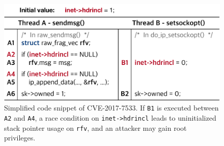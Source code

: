\begin{figure}[t]
  \centering
  \includegraphics[width=0.95\linewidth]{fig/cve-2017-10661.pdf}
  \caption{Simplified code snippet of CVE-2017-7533. If \texttt{B1} is
    executed between \texttt{A2} and \texttt{A4}, a race condition on
    \texttt{inet->hdrincl} leads to uninitialized stack pointer usage
    on \texttt{rfv}, and an attacker may gain root privileges.}
  \label{fig:cve-2019-6974}
\end{figure}







